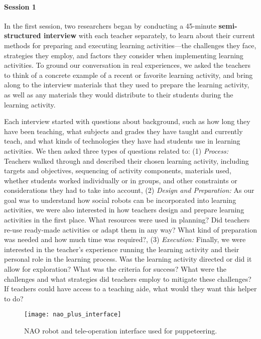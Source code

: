 \paragraph {Session 1} In the first session, two researchers began by conducting a 45-minute {\bf semi-structured interview} with each teacher separately, to learn about their current methods for preparing and executing learning activities---the challenges they face, strategies they employ, and factors they consider when implementing learning activities. To ground our conversation in real experiences, we asked the teachers to think of a concrete example of a recent or favorite learning activity, and bring along to the interview materials that they used to prepare the learning activity, as well as any materials they would distribute to their students during the learning activity.  

Each interview started with questions about background, such as how long they have been teaching, what subjects and grades they have taught and currently teach, and what kinds of technologies they have had students use in learning activities.  We then asked three types of questions related to: (1) {\it Process:} Teachers walked through and described their chosen learning activity, including targets and objectives, sequencing of activity components, materials used, whether students worked individually or in groups, and other constraints or considerations they had to take into account,  (2) {\it Design and Preparation:} As our goal was to understand how social robots can be incorporated into learning activities, we were also interested in how teachers design and prepare learning activities in the first place.  What resources were used in planning?  Did teachers re-use ready-made activities or adapt them in any way?  What kind of preparation was needed and how much time was required?,  (3) {\it Execution:} Finally, we were interested in the teacher's experience running the learning activity and their personal role in the learning process.  Was the learning activity directed or did it allow for exploration?  What was the criteria for success?  What were the challenges and what strategies did teachers employ to mitigate these challenges?  If teachers could have access to a teaching aide, what would they want this helper to do?  

\begin{figure}[htbp!]
    \centering
    \texttt{[image: nao\_plus\_interface]}
    \caption{NAO robot and tele-operation interface used for puppeteering.}
    \label{fig:nao}
\end{figure}

